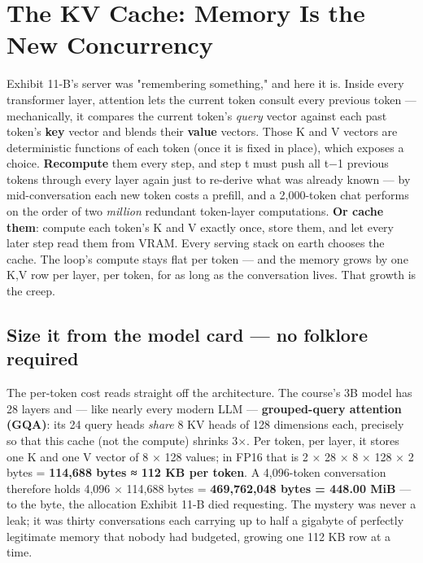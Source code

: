 \section{The KV Cache: Memory Is the New Concurrency}

Exhibit 11-B's server was "remembering something," and here it is. Inside every transformer layer, attention lets the current token consult every previous token — mechanically, it compares the current token's \textit{query} vector against each past token's \textbf{key} vector and blends their \textbf{value} vectors. Those K and V vectors are deterministic functions of each token (once it is fixed in place), which exposes a choice. \textbf{Recompute} them every step, and step t must push all t−1 previous tokens through every layer again just to re-derive what was already known — by mid-conversation each new token costs a prefill, and a 2,000-token chat performs on the order of two \textit{million} redundant token-layer computations. \textbf{Or cache them}: compute each token's K and V exactly once, store them, and let every later step read them from VRAM. Every serving stack on earth chooses the cache. The loop's compute stays flat per token — and the memory grows by one K,V row per layer, per token, for as long as the conversation lives. That growth is the creep.

\subsection*{Size it from the model card — no folklore required}

The per-token cost reads straight off the architecture. The course's 3B model has 28 layers and — like nearly every modern LLM — \textbf{grouped-query attention (GQA)}: its 24 query heads \textit{share} 8 KV heads of 128 dimensions each, precisely so that this cache (not the compute) shrinks 3×. Per token, per layer, it stores one K and one V vector of 8 × 128 values; in FP16 that is 2 × 28 × 8 × 128 × 2 bytes = \textbf{114,688 bytes ≈ 112 KB per token}. A 4,096-token conversation therefore holds 4,096 × 114,688 bytes = \textbf{469,762,048 bytes = 448.00 MiB} — to the byte, the allocation Exhibit 11-B died requesting. The mystery was never a leak; it was thirty conversations each carrying up to half a gigabyte of perfectly legitimate memory that nobody had budgeted, growing one 112 KB row at a time.

